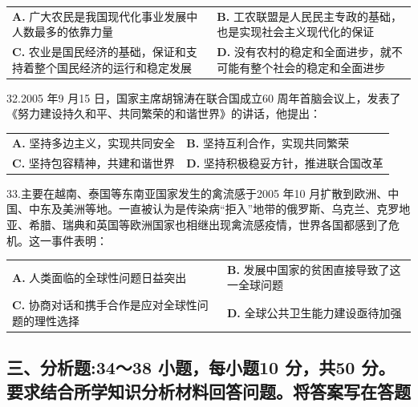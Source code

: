 \documentclass[UTF8,11pt]{ctexart}
\begin{document}
\begin{center}\begin{tabular}{>{\raggedright\arraybackslash}p{\dimexpr(\linewidth-4\tabcolsep)/2\relax}>{\raggedright\arraybackslash}p{\dimexpr(\linewidth-4\tabcolsep)/2\relax}}
\textbf{A.} 广大农民是我国现代化事业发展中人数最多的依靠力量 & \textbf{B.} 工农联盟是人民民主专政的基础，也是实现社会主义现代化的保证\\[.35em]
\textbf{C.} 农业是国民经济的基础，保证和支持着整个国民经济的运行和稳定发展 & \textbf{D.} 没有农村的稳定和全面进步，就不可能有整个社会的稳定和全面进步\\[.35em]\end{tabular}\end{center}

32.2005 年9 月15 日，国家主席胡锦涛在联合国成立60 周年首脑会议上，发表了《努力建设持久和平、共同繁荣的和谐世界》的讲话，他提出：


\begin{center}\begin{tabular}{>{\raggedright\arraybackslash}p{\dimexpr(\linewidth-4\tabcolsep)/2\relax}>{\raggedright\arraybackslash}p{\dimexpr(\linewidth-4\tabcolsep)/2\relax}}
\textbf{A.} 坚持多边主义，实现共同安全 & \textbf{B.} 坚持互利合作，实现共同繁荣\\[.35em]
\textbf{C.} 坚持包容精神，共建和谐世界 & \textbf{D.} 坚持积极稳妥方针，推进联合国改革\\[.35em]\end{tabular}\end{center}

33.主要在越南、泰国等东南亚国家发生的禽流感于2005 年10 月扩散到欧洲、中国、中东及美洲等地。一直被认为是传染病“拒入”地带的俄罗斯、乌克兰、克罗地亚、希腊、瑞典和英国等欧洲国家也相继出现禽流感疫情，世界各国都感到了危机。这一事件表明：


\begin{center}\begin{tabular}{>{\raggedright\arraybackslash}p{\dimexpr(\linewidth-4\tabcolsep)/2\relax}>{\raggedright\arraybackslash}p{\dimexpr(\linewidth-4\tabcolsep)/2\relax}}
\textbf{A.} 人类面临的全球性问题日益突出 & \textbf{B.} 发展中国家的贫困直接导致了这一全球问题\\[.35em]
\textbf{C.} 协商对话和携手合作是应对全球性问题的理性选择 & \textbf{D.} 全球公共卫生能力建设亟待加强\\[.35em]\end{tabular}\end{center}

\subsection*{三、分析题:34～38 小题，每小题10 分，共50 分。要求结合所学知识分析材料回答问题。将答案写在答题}
\end{document}

